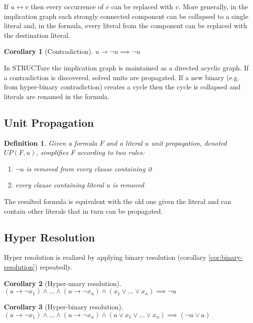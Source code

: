 \documentclass[12pt]{article}
\newtheorem{definition}{Definition}
\newtheorem{corollary}{Corollary}
\begin{document}
If $u \leftrightarrow v$ then every occurrence of $v$ can be replaced with $v$. More generally,
in the implication graph each strongly connected component can be collapsed to a single literal
and, in the formula, every literal from the component can be replaced with the destination literal.

\begin{corollary}[Contradiction]
$u \rightarrow \neg u \implies \neg u$
\end{corollary}

In STRUCTure the implication graph is maintained as a directed acyclic graph. If a contradiction
is discovered, solved units are propagated. If a new binary (e.g. from hyper-binary contradiction)
creates a cycle then the cycle is collapsed and literals are renamed in the formula.


\subsection{Unit Propagation}
\begin{definition}
Given a formula $F$ and a literal $u$ \emph{unit propagation}, denoted $UP(F, u)$, simplifies
F according to two rules:
\begin{enumerate}
\item $\neg u$ is removed from every clause containing it
\item every clause containing literal $u$ is removed
\end{enumerate}
\end{definition}

The resulted formula is equivalent with the old one given the literal and can contain other
literals that in turn can be propagated.


\subsection{Hyper Resolution}

Hyper resolution is realized by applying binary resolution (corollary \ref{cor:binary-resolution})
repeatedly.

\begin{corollary}[Hyper-unary resolution]
$(u \rightarrow \neg x_1) \land \ldots \land (u \rightarrow \neg x_n) \land (x_1 \lor \dots \lor x_n) \implies \neg u$
\end{corollary}

\begin{corollary}[Hyper-binary resolution]
$(u \rightarrow \neg x_1) \land \ldots \land (u \rightarrow \neg x_n) \land (a \lor x_1 \lor \dots \lor x_n) \implies (\neg u \lor a)$
\end{corollary}
\end{document}
